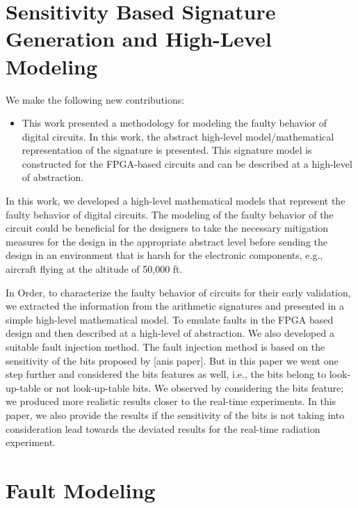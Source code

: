 



\section{Sensitivity Based Signature Generation and
High-Level Modeling}





We make the following new contributions: \\

\begin{itemize}


\item{This work presented a methodology for modeling the faulty behavior of digital circuits. In this work, the abstract high-level model/mathematical representation of the signature is presented. This signature model is constructed for the FPGA-based circuits and can be described at a high-level of abstraction.}  
\end{itemize}

In this work, we developed a high-level mathematical models that represent the faulty behavior of digital circuits. The modeling of the faulty behavior of the circuit could be beneficial for the designers to take the necessary mitigation measures for the design in the appropriate abstract level before sending the design in an environment that is harsh for the electronic components, e.g., aircraft flying at the altitude of 50,000 ft. 

In Order, to characterize the faulty behavior of circuits for their early validation, we extracted the information from the arithmetic signatures and presented in a simple high-level mathematical model. To emulate faults in the FPGA based design and then described at a high-level of abstraction. We also developed a suitable fault injection method. The fault injection method is based on the sensitivity of the bits proposed by [anis paper]. But in this paper we went one step further and considered the bits features as well, i.e., the bits belong to look-up-table or not look-up-table bits. We observed by considering the bits feature; we produced more realistic results closer to the real-time experiments. In this paper, we also provide the results if the sensitivity of the bits is not taking into consideration lead towards the deviated results for the real-time radiation experiment.



\section{Fault Modeling}

